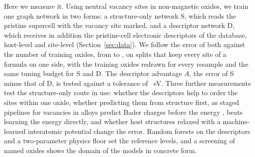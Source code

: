 Here we measure it. Using \numFilterCascadeStepsFinalSites{} neutral vacancy sites in \numFilterCascadeStepsFinalHosts{} non-magnetic oxides, we train one graph network in two forms: a structure-only network S, which reads the pristine supercell with the vacancy site marked, and a descriptor network D, which receives in addition the \numRfElectronicNFeatures{} pristine-cell electronic descriptors of the database, \numNetDescriptorsHost{} host-level and \numNetDescriptorsSite{} site-level (Section~\ref{sec:data}). We follow the error of both against the number of training oxides, from \numCfgBudgetsHostsItemOne{} to \numCfgBudgetsMax{}, on splits that keep every site of a formula on one side, with the training oxides redrawn for every resample and the same tuning budget for S and D. The descriptor advantage $A$, the error of S minus that of D, is tested against a tolerance of \numNetTolerance{}~eV. Three further measurements test the structure-only route in use: whether the descriptors help to order the sites within one oxide, whether predicting them from structure first, as staged pipelines for vacancies in alloys predict Bader charges before the energy \citep{Linton2026framework}, beats learning the energy directly, and whether host structures relaxed with a machine-learned interatomic potential change the error. Random forests on the descriptors and a two-parameter physics floor set the reference levels, and a screening of named oxides shows the domain of the models in concrete form.
